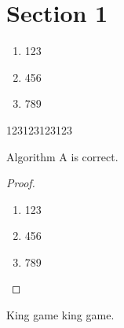 
% 
\section{Section 1}

\begin{frame}{}
  \begin{enumerate}
    \item 123
    \item 456
    \item 789
  \end{enumerate}
\end{frame}

\begin{frame}{}
  
\begin{property}
  123123123123
\end{property}

\begin{theorem}
  Algorithm A is correct.
\end{theorem}

\end{frame}

\begin{frame}{}
  \begin{proof}
    \begin{enumerate}
      \item 123
      \item 456
      \item 789
    \end{enumerate}
  \end{proof}
\end{frame}

\begin{frame}{}

  \begin{problem}
    King game king game.
  \end{problem}

\end{frame}

